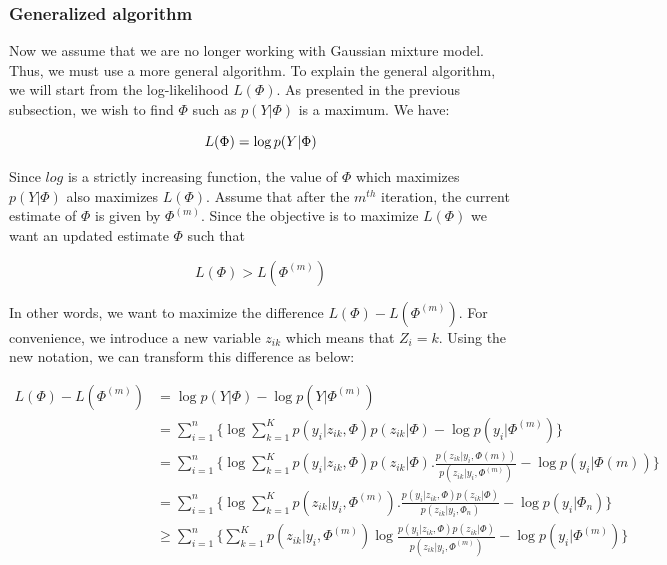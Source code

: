 \subsubsection{Generalized algorithm}\label{GENERAL}
Now we assume that we are no longer working with Gaussian mixture model. Thus, we must use a more general algorithm. %
To explain the general algorithm, we will start from the log-likelihood $L(\Phi)$. As presented in the previous subsection, we wish to find $\Phi$ such as $p(Y|\Phi)$ is a maximum. We have:

  \begin{equation*}
  L(\Phi)=\operatorname*{log} p(Y|\Phi)\\
  \end{equation*}
 
Since $log$ is a strictly increasing function, the value of $\Phi$ which maximizes  $p(Y|\Phi)$ also maximizes $L(\Phi)$. Assume that after the $m^{th}$ iteration, the current estimate of $\Phi$ is given by $\Phi^{(m)}$. Since the objective is to maximize $L(\Phi)$ we want an updated estimate $\Phi$ such that

  \begin{equation*}
  L(\Phi)>L(\Phi^{(m)})
  \end{equation*}
 
In other words, we want to maximize the difference $L(\Phi)-L(\Phi^{(m)})$. For convenience, we introduce a new variable $z_{ik}$ which means that $Z_i=k$. Using the new notation, we can transform this difference as below:

 
  \begin{align*}
  L(\Phi)-L(\Phi^{(m)}) &=\operatorname*{log} p(Y|\Phi) -\operatorname*{log} p(Y|\Phi^{(m)})\\
                    &=\sum_{i=1}^n\{\operatorname*{log} \sum_{k=1}^K p(y_i|z_{ik},\Phi)p(z_{ik}|\Phi)-\operatorname*{log} p(y_i|\Phi^{(m)})\}\\
                    &=\sum_{i=1}^n\{\operatorname*{log} \sum_{k=1}^K p(y_i|z_{ik},\Phi)p(z_{ik}|\Phi).\frac{p(z_{ik}|y_i,\Phi{(m)})}{p(z_{ik}|y_i,\Phi^{(m)})}-\operatorname*{log} p(y_i|\Phi{(m)})\}\\
                    &=\sum_{i=1}^n\{\operatorname*{log} \sum_{k=1}^K p(z_{ik}|y_i,\Phi^{(m)}).\frac{p(y_i|z_{ik},\Phi)p(z_{ik}|\Phi)}{p(z_{ik}|y_i,\Phi_n)}-\operatorname*{log} p(y_i|\Phi_n)\}\\
                    &\geq \sum_{i=1}^n\{\sum_{k=1}^K p(z_{ik}|y_i,\Phi^{(m)})\operatorname*{log} \frac{p(y_i|z_{ik},\Phi)p(z_{ik}|\Phi)}{p(z_{ik}|y_i,\Phi^{(m)})}-\operatorname*{log} p(y_i|\Phi^{(m)})\}
  \end{align*}

